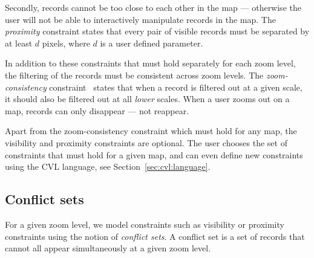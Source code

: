 Secondly, records cannot be too close to each other in the map --- otherwise the user will not be able to interactively manipulate records in the map. The \emph{proximity} constraint states that every pair of visible records must be separated by at least $d$ pixels, where $d$ is a user defined parameter.

In addition to these constraints that must hold separately for each zoom level, the filtering of the records must be consistent across zoom levels. The \emph{zoom-consistency} constraint~\cite{sarma2012fusiontables} states that when a record is filtered out at a given scale, it should also be filtered out at all \emph{lower} scales. When a user zooms out on a map, records can only disappear --- not reappear.

Apart from the zoom-consistency constraint which must hold for any map, the visibility and proximity constraints are optional. The user chooses the set of constraints that must hold for a given map, and can even define new constraints using the CVL language, see Section~\ref{sec:cvl:language}.

\subsection{Conflict sets}
\label{sec:conflicts}

For a given zoom level, we model constraints such as visibility or proximity constraints using the notion of \emph{conflict sets}. A conflict set is a set of records that cannot all appear simultaneously at a given zoom level. 

